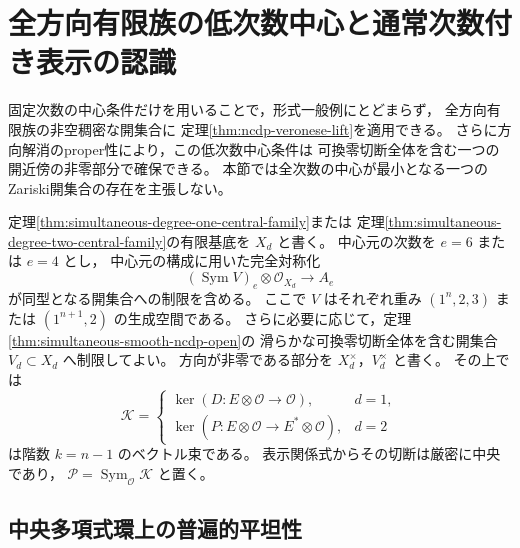 \section{全方向有限族の低次数中心と通常次数付き表示の認識}
\label{sec:simultaneous-low-center}

固定次数の中心条件だけを用いることで，形式一般例にとどまらず，
全方向有限族の非空稠密な開集合に
定理\ref{thm:ncdp-veronese-lift}を適用できる。
さらに方向解消のproper性により，この低次数中心条件は
可換零切断全体を含む一つの開近傍の非零部分で確保できる。
本節では全次数の中心が最小となる一つのZariski開集合の存在を主張しない。

定理\ref{thm:simultaneous-degree-one-central-family}または
定理\ref{thm:simultaneous-degree-two-central-family}の有限基底を $X_d$ と書く。
中心元の次数を $e=6$ または $e=4$ とし，
中心元の構成に用いた完全対称化
\[
 (\operatorname{Sym}V)_e\otimes\mathcal O_{X_d}\longrightarrow A_e
\]
が同型となる開集合への制限を含める。
ここで $V$ はそれぞれ重み $(1^n,2,3)$ または $(1^{n+1},2)$ の生成空間である。
さらに必要に応じて，定理\ref{thm:simultaneous-smooth-ncdp-open}の
滑らかな可換零切断全体を含む開集合 $V_d\subset X_d$ へ制限してよい。
方向が非零である部分を $X_d^\times$，$V_d^\times$ と書く。
その上では
\[
 \mathcal K=
 \begin{cases}
  \ker(D:E\otimes\mathcal O\to\mathcal O),&d=1,\\
  \ker(P:E\otimes\mathcal O\to E^*\otimes\mathcal O),&d=2
 \end{cases}
\]
は階数 $k=n-1$ のベクトル束である。
表示関係式からその切断は厳密に中央であり，
$\mathcal P=\operatorname{Sym}_{\mathcal O}\mathcal K$ と置く。

\subsection{中央多項式環上の普遍的平坦性}

